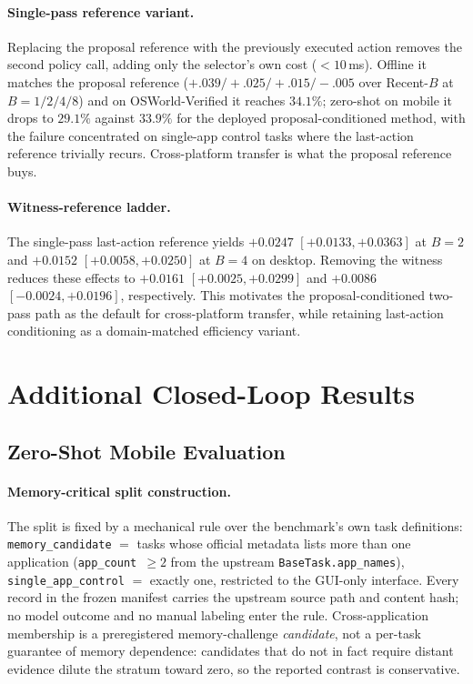 \documentclass[letterpaper]{article} %
\begin{document}
\paragraph{Single-pass reference variant.}
Replacing the proposal reference with the previously executed action
removes the second policy call, adding only the selector's own cost
($<10$\,ms). Offline it matches the proposal reference
($+.039/+.025/+.015/-.005$ over Recent-$B$ at $B{=}1/2/4/8$) and on
OSWorld-Verified it reaches $34.1\%$; zero-shot on mobile it drops to
$29.1\%$ against $33.9\%$ for the deployed proposal-conditioned method,
with the failure concentrated on single-app control tasks where the
last-action reference trivially recurs. Cross-platform transfer is what
the proposal reference buys.

\paragraph{Witness-reference ladder.}
The single-pass last-action reference yields
$+0.0247$ $[+0.0133,+0.0363]$ at $B{=}2$ and
$+0.0152$ $[+0.0058,+0.0250]$ at $B{=}4$ on desktop.
Removing the witness reduces these effects to
$+0.0161$ $[+0.0025,+0.0299]$ and
$+0.0086$ $[-0.0024,+0.0196]$, respectively. This motivates the
proposal-conditioned two-pass path as the default for cross-platform transfer,
while retaining last-action conditioning as a domain-matched efficiency
variant.

\section{Additional Closed-Loop Results}

\subsection{Zero-Shot Mobile Evaluation}

\paragraph{Memory-critical split construction.}
The split is fixed by a mechanical rule over the benchmark's own task
definitions: \texttt{memory\_candidate} $=$ tasks whose official metadata
lists more than one application (\texttt{app\_count}~$\geq 2$ from the
upstream \texttt{BaseTask.app\_names}), \texttt{single\_app\_control} $=$
exactly one, restricted to the GUI-only interface. Every record in the
frozen manifest carries the upstream source path and content hash; no
model outcome and no manual labeling enter the rule. Cross-application
membership is a preregistered memory-challenge \emph{candidate}, not a
per-task guarantee of memory dependence: candidates that do not in fact
require distant evidence dilute the stratum toward zero, so the reported
contrast is conservative.
\end{document}
